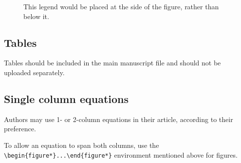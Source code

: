 \documentclass[
  9pt,
  twocolumn,
  twoside]{pnas-new}
\begin{document}
\begin{figure}


\caption{\label{fig-side}This legend would be placed at the side of the
figure, rather than below it.}

\end{figure}%

\subsection*{Tables}\label{tables}

Tables should be included in the main manuscript file and should not be
uploaded separately.

\subsection*{Single column equations}\label{single-column-equations}

Authors may use 1- or 2-column equations in their article, according to
their preference.

To allow an equation to span both columns, use the
\texttt{\textbackslash{}begin\{figure*\}...\textbackslash{}end\{figure*\}}
environment mentioned above for figures.
\end{document}
